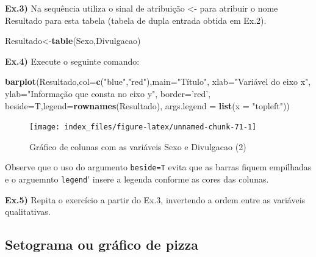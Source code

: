 \documentclass[12pt,brazil,oneside]{book}
\newenvironment{Shaded}{\begin{snugshade}}{\end{snugshade}}
\newcommand{\DataTypeTok}[1]{\textcolor[rgb]{0.13,0.29,0.53}{#1}}
\newcommand{\KeywordTok}[1]{\textcolor[rgb]{0.13,0.29,0.53}{\textbf{#1}}}
\newcommand{\NormalTok}[1]{#1}
\newcommand{\StringTok}[1]{\textcolor[rgb]{0.31,0.60,0.02}{#1}}
\begin{document}
\textbf{Ex.3)} Na sequência utiliza o sinal de atribuição \textless{}-
para atribuir o nome Resultado para esta tabela (tabela de dupla entrada
obtida em Ex.2).

\begin{Shaded}
\begin{Highlighting}[]
\NormalTok{Resultado<-}\KeywordTok{table}\NormalTok{(Sexo,Divulgacao)}
\end{Highlighting}
\end{Shaded}

\textbf{Ex.4)} Execute o seguinte comando:

\begin{Shaded}
\begin{Highlighting}[]
\KeywordTok{barplot}\NormalTok{(Resultado,}\DataTypeTok{col=}\KeywordTok{c}\NormalTok{(}\StringTok{"blue"}\NormalTok{,}\StringTok{"red"}\NormalTok{),}\DataTypeTok{main=}\StringTok{"Título"}\NormalTok{,}
        \DataTypeTok{xlab=}\StringTok{"Variável do eixo x"}\NormalTok{,}
        \DataTypeTok{ylab=}\StringTok{"Informação que consta no eixo y"}\NormalTok{, }
        \DataTypeTok{border=}\StringTok{'red'}\NormalTok{, }
        \DataTypeTok{beside=}\NormalTok{T,}\DataTypeTok{legend=}\KeywordTok{rownames}\NormalTok{(Resultado),}
        \DataTypeTok{args.legend =} \KeywordTok{list}\NormalTok{(}\DataTypeTok{x =} \StringTok{"topleft"}\NormalTok{))}
\end{Highlighting}
\end{Shaded}

\begin{figure}[H]

{\centering \texttt{[image: index\_files/figure-latex/unnamed-chunk-71-1]} 

}

\caption{Gráfico de colunas com as variáveis Sexo e Divulgacao (2)}\label{fig:unnamed-chunk-71}
\end{figure}

Observe que o uso do argumento \texttt{beside=T} evita que as barras
fiquem empilhadas e o arguemnto \texttt{legend}' insere a legenda
conforme as cores das colunas.

\textbf{Ex.5)} Repita o exercício a partir do Ex.3, invertendo a ordem
entre as variáveis qualitativas.

\hypertarget{setograma-ou-grafico-de-pizza}{%
\subsection{Setograma ou gráfico de
pizza}\label{setograma-ou-grafico-de-pizza}}
\end{document}
